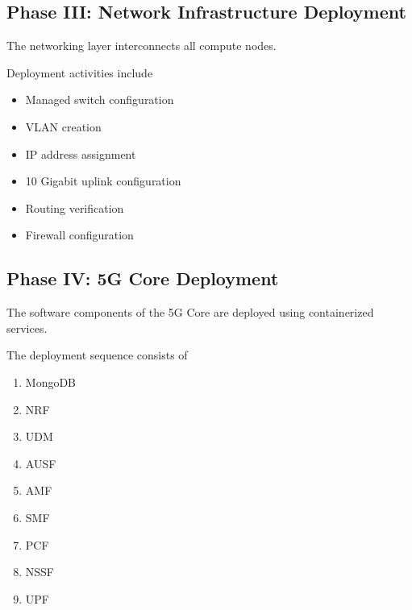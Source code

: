 \documentclass[12pt,a4paper]{article}\usepackage[a4paper,margin=1in]{geometry}\usepackage{graphicx}\usepackage{longtable}\usepackage{booktabs}\usepackage{hyperref}\usepackage{enumitem}\usepackage{amsmath}\usepackage{tikz}\usepackage{pgfgantt}\usepackage{setspace}\setstretch{1.15}\usetikzlibrary{positioning,arrows.meta,shapes.geometric}
\begin{document}
	
	\subsection{Phase III: Network Infrastructure Deployment}
	
	The networking layer interconnects all compute nodes.
	
	Deployment activities include
	
	\begin{itemize}
		
		\item Managed switch configuration
		
		\item VLAN creation
		
		\item IP address assignment
		
		\item 10 Gigabit uplink configuration
		
		\item Routing verification
		
		\item Firewall configuration
		
	\end{itemize}
	
	
	\subsection{Phase IV: 5G Core Deployment}
	
	The software components of the 5G Core are deployed using containerized services.
	
	The deployment sequence consists of
	
	\begin{enumerate}
		
		\item MongoDB
		
		\item NRF
		
		\item UDM
		
		\item AUSF
		
		\item AMF
		
		\item SMF
		
		\item PCF
		
		\item NSSF
		
		\item UPF
		
	\end{enumerate}
	
\end{document}
